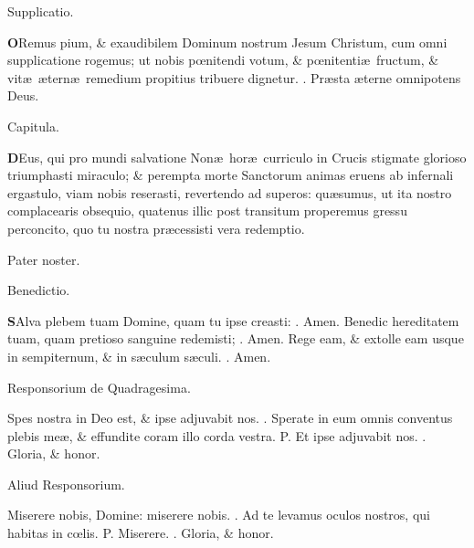 \documentclass[letter,11pt]{book}
\makeatletter
\DeclareRobustCommand{\Vbar}{\vers@resp{-0.1em}{V}}
\DeclareRobustCommand{\Rbar}{\vers@resp{0pt}{R}}
\newcommand{\vers@resp@sym}{\raisebox{0.2ex}{\rotatebox[origin=c]{-20}{$\m@th\rceil$}}}
\newcommand{\vers@resp}[2]{%
  {\ooalign{\hidewidth\kern#1\vers@resp@sym\hidewidth\cr#2\cr}}%
}%
\def\P{\color{Red} P. \color{black}}
\def\V{\color{Red} \Vbar . \color{black}}
\def\R{\color{Red} \Rbar . \color{black}}
\makeatother
\begin{document}
\begin{multicols*}{2}
\vspace{-.5em} \begin{center} \color{Red} Supplicatio. \end{center} \vspace{-.5em}
\lettrine[lines=2]{\bfseries \color{Red} O}{}Remus pium, \& exaudibilem Dominum nostrum Jesum Christum, cum omni supplicatione rogemus; ut nobis p\oe nitendi votum, \& p\oe nitenti\ae \ fructum, \& vit\ae \ \ae tern\ae \ remedium propitius tribuere dignetur. \R Pr\ae sta \ae terne omnipotens Deus.
\vspace{-.5em} \begin{center} \color{Red} Capitula. \end{center} \vspace{-.5em}
\lettrine[lines=2]{\bfseries \color{Red} D}{}Eus, qui pro mundi salvatione Non\ae \ hor\ae \ curriculo in Crucis stigmate glorioso triumphasti miraculo; \& perempta morte Sanctorum animas eruens ab infernali ergastulo, viam nobis reserasti, revertendo ad superos: qu\ae sumus, ut ita nostro complacearis obsequio, quatenus illic post transitum properemus gressu perconcito, quo tu nostra pr\ae cessisti vera redemptio.
\par Pater noster.
\vspace{-.5em} \begin{center} \color{Red} Benedictio. \end{center} \vspace{-.5em}
\lettrine[lines=2]{\bfseries \color{Red} S}{}Alva plebem tuam Domine, quam tu ipse creasti: \R Amen. Benedic hereditatem tuam, quam pretioso sanguine redemisti; \R Amen. Rege eam, \& extolle eam usque in sempiternum, \& in s\ae culum s\ae culi. \R Amen.
\vspace{-.5em} \begin{center} \color{Red} Responsorium de Quadragesima. \end{center} \vspace{-.5em}
\par \noindent Spes nostra in Deo est, \& ipse adjuvabit nos. \V Sperate in eum omnis conventus plebis me\ae , \& effundite coram illo corda vestra. \P Et ipse adjuvabit nos. \V Gloria, \& honor.
\vspace{-.5em} \begin{center} \color{Red} Aliud Responsorium. \end{center} \vspace{-.5em}
\par \noindent Miserere nobis, Domine: miserere nobis. \V Ad te levamus oculos nostros, qui habitas in c\oe lis. \P Miserere. \V Gloria, \& honor.

\end{multicols*}
\end{document}
